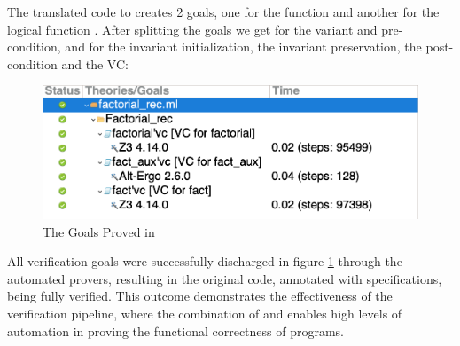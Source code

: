 The translated code to \whyml creates 2 goals, one for the function  and another for the logical function
. After splitting the goals we get for  the variant and pre-condition, and for
 the invariant initialization, the invariant preservation, the post-condition and the VC:

\begin{figure}[H]
    \centering
    \includegraphics[width=0.7\linewidth]{images/Why3Goals.png}
    \caption{The Goals Proved in \whythree}
    \label{fig:Why3Goals}
\end{figure}

All verification goals were successfully discharged in figure \ref{fig:Why3Goals} through the automated provers, resulting in the 
original \ocaml code, annotated 
with \gospel specifications, being fully verified. This outcome demonstrates the effectiveness of the verification pipeline, 
where the combination of \cameleer and \whythree enables high levels of automation in proving the functional correctness of 
\ocaml programs.